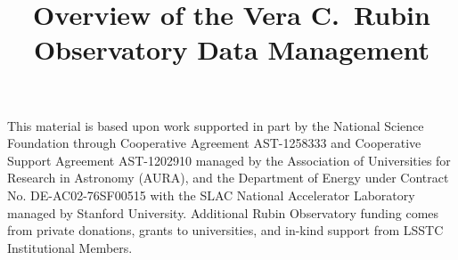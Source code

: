 \documentclass[twocolumn]{aastex7}
\begin{document}

\title{Overview of the Vera C.\ Rubin Observatory Data Management}






\begin{acknowledgments}
This material is based upon work supported in part by the National Science Foundation through Cooperative Agreement AST-1258333 and Cooperative Support Agreement AST-1202910 managed by the Association of Universities for Research in Astronomy (AURA), and the Department of Energy under Contract No. DE-AC02-76SF00515 with the SLAC National Accelerator Laboratory managed by Stanford University.
Additional Rubin Observatory funding comes from private donations, grants to universities, and in-kind support from LSSTC Institutional Members.
\end{acknowledgments}


\label{sec:bib}


\end{document}

